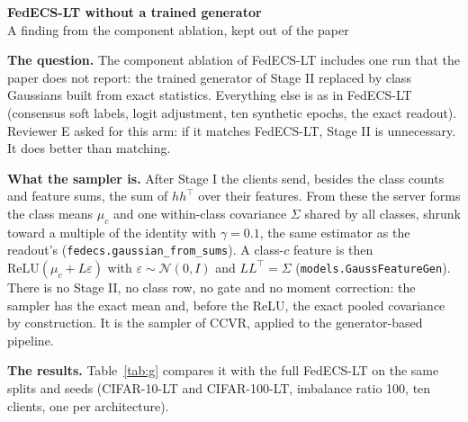 \documentclass[11pt,a4paper]{article}
\renewcommand{\paragraph}[1]{\par\medskip\noindent\textbf{#1.}\enspace}
\begin{document}
\begin{center}
{\Large\bfseries FedECS-LT without a trained generator}\\[4pt]
{\small A finding from the component ablation, kept out of the paper}
\end{center}
\medskip

\paragraph{The question} The component ablation of FedECS-LT includes one run that the paper does not report: the
trained generator of Stage II replaced by class Gaussians built from exact statistics. Everything else is as in
FedECS-LT (consensus soft labels, logit adjustment, ten synthetic epochs, the exact readout). Reviewer E asked for this
arm: if it matches FedECS-LT, Stage II is unnecessary. It does better than matching.

\paragraph{What the sampler is} After Stage I the clients send, besides the class counts and feature sums, the sum of
$hh^\top$ over their features. From these the server forms the class means $\mu_c$ and one within-class covariance
$\Sigma$ shared by all classes, shrunk toward a multiple of the identity with $\gamma=0.1$, the same estimator as the
readout's (\texttt{fedecs.gaussian\_from\_sums}). A class-$c$ feature is then $\mathrm{ReLU}(\mu_c+L\varepsilon)$ with
$\varepsilon\sim\mathcal N(0,I)$ and $LL^\top=\Sigma$ (\texttt{models.GaussFeatureGen}). There is no Stage II, no class
row, no gate and no moment correction: the sampler has the exact mean and, before the ReLU, the exact pooled
covariance by construction. It is the sampler of CCVR, applied to the generator-based pipeline.

\paragraph{The results} Table~\ref{tab:g} compares it with the full FedECS-LT on the same splits and seeds (CIFAR-10-LT
and CIFAR-100-LT, imbalance ratio 100, ten clients, one per architecture).
\end{document}
